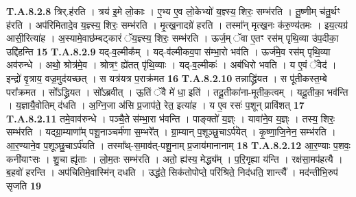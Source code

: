 \documentclass[17pt]{extarticle}
\begin{document}
                  \newline
                                                                  \textbf{ T.A.8.2.8} \newline
                  त्रिर्.ह॑रति । त्रय॑ इ॒मे लो॒काः । ए॒भ्य ए॒व लो॒केभ्यो॑ य॒ज्ञ्स्य॒ शिरः॒ सम्भ॑रति । तू॒ष्णीम् च॑तु॒र्थꣳ ह॑रति । अप॑रिमितादे॒व य॒ज्ञ्स्य॒ शिरः॒ सम्भ॑रति ।  मृ॒त्ख॒नादग्रे॑ हरति । तस्मा᳚न् मृत्ख॒नः क॑रु॒ण्य॑तमः । इय॒त्यग्र॑ आसी॒रित्या॑ह । अ॒स्यामे॒वाछ॑म्बट्कारं ॅय॒ज्ञ्स्य॒ शिरः॒ सम्भ॑रति । ऊर्ज॒म् ॅवा ए॒तꣳ रस॑म् पृथि॒व्या उ॑प॒दीका॒ उद्दि॑हन्ति \textbf{ 15} \newline
                  \newline
                                                                  \textbf{ T.A.8.2.9} \newline
                  यद्-व॒ल्मीक᳚म् । यद्-व॑ल्मीकव॒पा स॑म्भा॒रो भव॑ति ।  ऊर्ज॑मे॒व रस॑म् पृथि॒व्या अव॑रुन्धे । अथो॒ श्रोत्र॑मे॒व । श्रोत्रꣳ॒॒ ह्ये॑तत् पृ॑थि॒व्याः । यद्-व॒ल्मीकः॑ । अब॑धिरो भवति । य ए॒वं ॅवेद॑ । इन्द्रो॑ वृ॒त्राय॒ वज्र॒मुद॑यच्छत् ।  स यत्र॑यत्र प॒राक्र॑मत \textbf{ 16} \newline
                  \newline
                                                                  \textbf{ T.A.8.2.10} \newline
                  तन्नाद्ध्रि॑यत । स पू॑तीकस्त॒म्बे परा᳚क्रमत । सो᳚ऽद्ध्रियत । सो᳚ऽब्रवीत् । ऊ॒तिं ॅवै मे॑ धा॒ इति॑ । तदू॒तीका॑ना-मूतीक॒त्वम् । यदू॒तीका॒ भव॑न्ति ।  य॒ज्ञायै॒वोतिम् द॑धति । अ॒ग्नि॒जा अ॑सि प्र॒जाप॑ते॒ रेत॒ इत्या॑ह । य ए॒व रसः॑ प॒शून् प्रावि॑शत् \textbf{ 17} \newline
                  \newline
                                                                  \textbf{ T.A.8.2.11} \newline
                  तमे॒वाव॑रुन्धे । पञ्चै॒ते स॑म्भा॒रा भ॑वन्ति । पाङ्क्तो॑ य॒ज्ञ्ः । यावा॑ने॒व य॒ज्ञ्ः । तस्य॒ शिरः॒ सम्भ॑रति । यद्ग्रा॒म्याणा᳚म् पशू॒नाञ्चर्म॑णा स॒म्भरे᳚त् । ग्रा॒म्यान् प॒शूञ्छु॒चाऽर्प॑येत् । कृ॒ष्णा॒जि॒नेन॒ सम्भ॑रति । आ॒र॒ण्याने॒व प॒शूञ्छु॒चाऽर्प॑यति । तस्मा᳚थ्-स॒माव॑त्-पशू॒नाम् प्र॒जाय॑मानानाम् \textbf{ 18} \newline
                  \newline
                                                                  \textbf{ T.A.8.2.12} \newline
                  आ॒र॒ण्याः प॒शवः॒ कनी॑याꣳसः । शु॒चा ह्यृ॑ताः ।  लो॒म॒तः सम्भ॑रति । अतो॒ ह्य॑स्य॒ मेद्ध्य᳚म् । प॒रि॒गृह्या य॑न्ति । रक्ष॑सा॒मप॑हत्यै ।  ब॒हवो॑ हरन्ति । अप॑चितिमे॒वास्मि॑न् दधति ।  उद्ध॑ते॒ सिक॑तोपोप्ते॒ परि॑श्रिते॒ निद॑धति॒ शान्त्यै᳚ ।  मद॑न्तीभि॒रुप॑ सृजति \textbf{ 19} \newline
\end{document}
